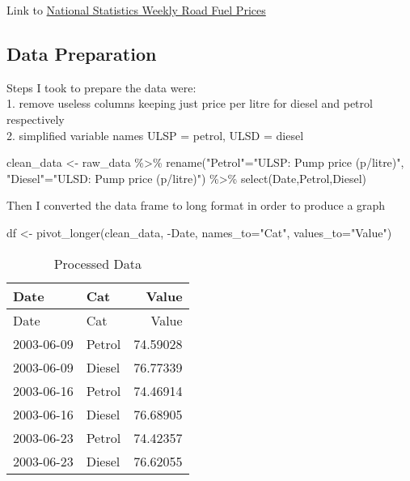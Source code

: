 \documentclass[
]{article}
\newenvironment{Shaded}{\begin{snugshade}}{\end{snugshade}}
\newcommand{\AttributeTok}[1]{\textcolor[rgb]{0.77,0.63,0.00}{#1}}
\newcommand{\FunctionTok}[1]{\textcolor[rgb]{0.00,0.00,0.00}{#1}}
\newcommand{\NormalTok}[1]{#1}
\newcommand{\OtherTok}[1]{\textcolor[rgb]{0.56,0.35,0.01}{#1}}
\newcommand{\SpecialCharTok}[1]{\textcolor[rgb]{0.00,0.00,0.00}{#1}}
\newcommand{\StringTok}[1]{\textcolor[rgb]{0.31,0.60,0.02}{#1}}
\begin{document}
Link to
\href{https://www.gov.uk/government/statistics/weekly-road-fuel-prices}{National
Statistics Weekly Road Fuel Prices}

\hypertarget{data-preparation}{%
\subsection{Data Preparation}\label{data-preparation}}

Steps I took to prepare the data were:\\
1. remove useless columns keeping just price per litre for diesel and
petrol respectively\\
2. simplified variable names ULSP = petrol, ULSD = diesel

\begin{Shaded}
\begin{Highlighting}[]
\NormalTok{clean\_data }\OtherTok{\textless{}{-}}\NormalTok{ raw\_data }\SpecialCharTok{\%\textgreater{}\%} 
  \FunctionTok{rename}\NormalTok{(}\StringTok{"Petrol"}\OtherTok{=}\StringTok{"ULSP:  Pump price (p/litre)"}\NormalTok{,}
         \StringTok{"Diesel"}\OtherTok{=}\StringTok{"ULSD: Pump price (p/litre)"}\NormalTok{) }\SpecialCharTok{\%\textgreater{}\%} 
  \FunctionTok{select}\NormalTok{(Date,Petrol,Diesel)}
\end{Highlighting}
\end{Shaded}

Then I converted the data frame to long format in order to produce a
graph

\begin{Shaded}
\begin{Highlighting}[]
\NormalTok{df }\OtherTok{\textless{}{-}} \FunctionTok{pivot\_longer}\NormalTok{(clean\_data, }
             \SpecialCharTok{{-}}\NormalTok{Date,}
             \AttributeTok{names\_to=}\StringTok{"Cat"}\NormalTok{,}
             \AttributeTok{values\_to=}\StringTok{"Value"}\NormalTok{)}
\end{Highlighting}
\end{Shaded}

\begin{longtable}[]{@{}llr@{}}
\caption{Processed Data}\tabularnewline
\toprule()
Date & Cat & Value \\
\midrule()
\endfirsthead
\toprule()
Date & Cat & Value \\
\midrule()
\endhead
2003-06-09 & Petrol & 74.59028 \\
2003-06-09 & Diesel & 76.77339 \\
2003-06-16 & Petrol & 74.46914 \\
2003-06-16 & Diesel & 76.68905 \\
2003-06-23 & Petrol & 74.42357 \\
2003-06-23 & Diesel & 76.62055 \\
\bottomrule()
\end{longtable}
\end{document}
